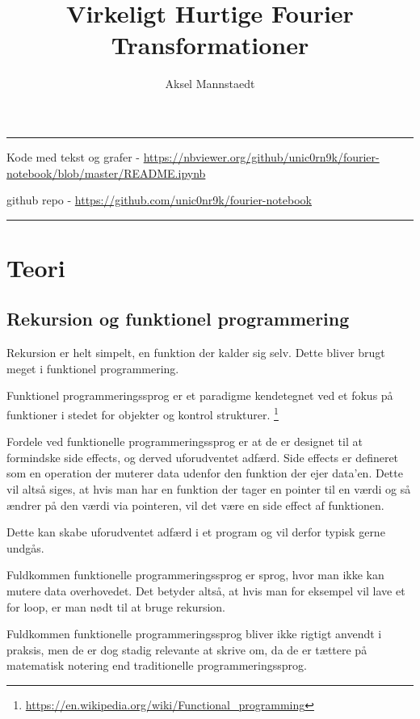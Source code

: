 \documentclass[11pt,a4paper]{article}
\author{Aksel Mannstaedt}
\date{}
\title{Virkeligt Hurtige Fourier Transformationer}
\begin{document}
\maketitle
\noindent\rule{\textwidth}{0.5pt}
\begin{center}
Kode med tekst og grafer - \url{https://nbviewer.org/github/unic0rn9k/fourier-notebook/blob/master/README.ipynb}

github repo - \url{https://github.com/unic0nr9k/fourier-notebook}
\end{center}

\noindent\rule{\textwidth}{0.5pt}

\setcounter{tocdepth}{2}
\tableofcontents
\newpage

\section{Teori}
\label{sec:org306180a}
\subsection{Rekursion og funktionel programmering}
\label{sec:orga50635b}

Rekursion er helt simpelt, en funktion der kalder sig selv.
Dette bliver brugt meget i funktionel programmering.

Funktionel programmeringssprog er et paradigme kendetegnet ved
et fokus på funktioner i stedet for objekter og kontrol strukturer. \footnote{\url{https://en.wikipedia.org/wiki/Functional\_programming}}

\bigskip

Fordele ved funktionelle programmeringssprog er at de er designet til at formindske side effects,
og derved uforudventet adfærd.
Side effects er defineret som en operation der muterer data udenfor den funktion der ejer data'en.
Dette vil altså siges, at hvis man har en funktion der tager en pointer til en værdi og så ændrer på
den værdi via pointeren, vil det være en side effect af funktionen.

Dette kan skabe uforudventet adfærd i et program og vil derfor typisk gerne undgås.

Fuldkommen funktionelle programmeringssprog er sprog, hvor man ikke kan mutere data overhovedet.
Det betyder altså, at hvis man for eksempel vil lave et for loop, er man nødt til at bruge rekursion.

Fuldkommen funktionelle programmeringssprog bliver ikke rigtigt anvendt i praksis,
men de er dog stadig relevante at skrive om, da de er tættere på matematisk notering
end traditionelle programmeringssprog.
\end{document}
